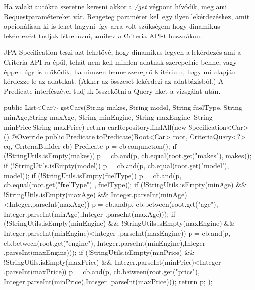 
Ha valaki autókra szeretne keresni akkor a \textit{/get} végpont hívódik, meg ami Requestparamétereket vár. Rengeteg paraméter kell egy ilyen lekérdezéshez, amit opcionálisan ki is lehet hagyni, így arra volt szükségem hogy dinamikus lekérdezést tudjak létrehozni, amihez a Criteria API-t használom.

JPA Specification teszi azt lehetővé, hogy dinamikus legyen a lekérdezés ami a Criteria API-ra épül, tehát nem kell minden adatnak szerepelnie benne, vagy éppen úgy is működik, ha nincsen benne szereplő kritérium, hogy mi alapján kérdezze le az adatokat. (Akkor az összeset lekérdezi az adatbázisból.) A Predicate interfészével tudjuk összekötni a Query-nket a vizsgálat után.

\begin{java}
public List<Car> getCars(String makes, String model,
      String fuelType, String minAge,String maxAge,
      String minEngine, String maxEngine, 
      String minPrice,String maxPrice) {
  return carRepository.findAll(new Specification<Car>() {
    @Override
    public Predicate toPredicate(Root<Car> root,
     CriteriaQuery<?> cq, CriteriaBuilder cb) {
        Predicate p = cb.conjunction();
        if (!StringUtils.isEmpty(makes)) {
            p = cb.and(p, cb.equal(root.get("makes"), makes));
        }
        if (!StringUtils.isEmpty(model)) {
            p = cb.and(p, cb.equal(root.get("model"), model));
        }
        if (!StringUtils.isEmpty(fuelType)) {
            p = cb.and(p, cb.equal(root.get("fuelType")
                                       , fuelType));
        }
        if (!StringUtils.isEmpty(minAge) && 
            !StringUtils.isEmpty(maxAge) &&
            Integer.parseInt(minAge)<Integer.parseInt(maxAge)) {
            p = cb.and(p, cb.between(root.get("age"),
            Integer.parseInt(minAge),Integer
                                    .parseInt(maxAge)));
        }
        if (!StringUtils.isEmpty(minEngine) &&
            !StringUtils.isEmpty(maxEngine) &&
            Integer.parseInt(minEngine)<Integer
                                       .parseInt(maxEngine)) {
            p = cb.and(p, cb.between(root.get("engine"),
            Integer.parseInt(minEngine),Integer
                                       .parseInt(maxEngine)));
        }
        if (!StringUtils.isEmpty(minPrice) &&
            !StringUtils.isEmpty(maxPrice) &&
            Integer.parseInt(minPrice)<Integer
                                       .parseInt(maxPrice)) {
             p = cb.and(p, cb.between(root.get("price"),
             Integer.parseInt(minPrice),Integer
                                       .parseInt(maxPrice)));
         }
         return p;
     }
  });
}
\end{java}

